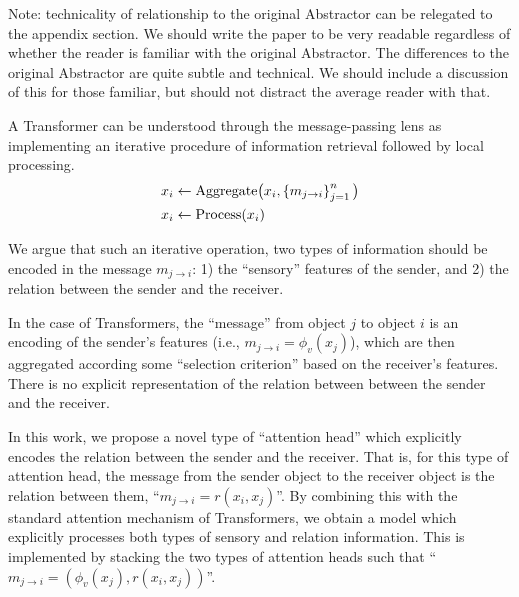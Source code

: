 Note: technicality of relationship to the original Abstractor can be relegated to the appendix section. We should write the paper to be very readable regardless of whether the reader is familiar with the original Abstractor. The differences to the original Abstractor are quite subtle and technical. We should include a discussion of this for those familiar, but should not distract the average reader with that.



A Transformer can be understood through the message-passing lens as implementing an iterative procedure of information retrieval followed by local processing.
\begin{equation}\label{eq:intro_message_passing}
  \begin{split}
    x_i &\gets \mathrm{Aggregate}\big(x_i, \left\{m_{j \to i}\right\}_{j=1}^{n}\big) \\
    x_i &\gets \mathrm{Process}(x_i)
  \end{split}
\end{equation}

We argue that such an iterative operation, two types of information should be encoded in the message $m_{j \to i}$: 1) the ``sensory'' features of the sender, and 2) the relation between the sender and the receiver.

In the case of Transformers, the ``message'' from object $j$ to object $i$ is an encoding of the sender's features (i.e., $m_{j \to i} = \phi_v(x_j)$), which are then aggregated according some ``selection criterion'' based on the receiver's features. There is no explicit representation of the relation between between the sender and the receiver.

In this work, we propose a novel type of ``attention head'' which explicitly encodes the relation between the sender and the receiver. That is, for this type of attention head, the message from the sender object to the receiver object is the relation between them, ``$m_{j \to i} = r(x_i, x_j)$''. By combining this with the standard attention mechanism of Transformers, we obtain a model which explicitly processes both types of sensory and relation information. This is implemented by stacking the two types of attention heads such that ``$m_{j \to i} = (\phi_v(x_j), r(x_i, x_j))$''.


